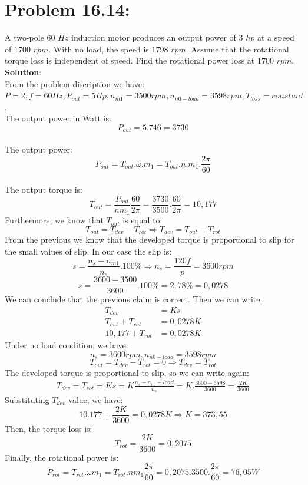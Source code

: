 \documentclass[9pt]{extarticle}
\begin{document}
\section*{Problem 16.14:} A two-pole $60$ $Hz$ induction motor produces an output power
of $3$ $hp$ at a speed of $1700$ $rpm$. With no load, the speed is $1798$ $rpm$. Assume that the
rotational torque loss is independent of speed. Find the rotational power loss at $1700$ $rpm$.
\\ \textbf{Solution}:\\ From the problem discription we have:
$P=2, f=60Hz, P_{out}=5Hp, n_{m1}=3500rpm, n_{n0-load}=3598 rpm, T_{loss}= constant$.
\\The output power in Watt is:
$$P_{out}=5.746=3730$$
\\The output power:
$$P_{out}=T_{out}.\omega.m_{1}=T_{out}.n.m_{1}.\frac{2\pi}{60}$$
\\The output torque is:
$$T_{out}=\frac{P_{out}}{nm_{1}}\frac{60}{2\pi}=\frac{3730}{3500}.\frac{60}{2\pi}=10,177$$
Furthermore, we know that $T_{out}$ is equal to:
$$T_{out}=T_{dev}-T_{rot}\Rightarrow T_{dev}=T_{out}+T_{rot}$$
From the previous we know that the developed torque is proportional to slip for
the small values of slip. In our case the slip is:
\begin{equation*}
s=\frac{n_{s}-n_{m1}}{n_{s}}.100\% \Rightarrow n_{s}=\frac{120f}{p}=3600 rpm
\end{equation*}
\begin{equation*}
s=\frac{3600-3500}{3600}.100\%=2,78\%=0,0278
\end{equation*}
We can conclude that the previous claim is correct. Then we can write:
\begin{align*}
T_{dev}&=Ks\\
T_{out}+T_{rot}&=0,0278K\\
10,177+T_{rot}&=0,0278K
\end{align*}
Under no load condition, we have:
$$n_{s}=3600 rpm, n_{n0-load}=3598 rpm$$
$$T_{out}=T_{dev}-T_{rot}=0\Rightarrow T_{dev}=T_{rot}$$
The developed torque is proportional to slip, so we can write again:
\begin{align*}
T_{dev}=T_{rot}=Ks=K\frac{n_{s}-n_{n0}-load}{n_{s}}=K.\frac{3600-3598}{3600}=\frac{2K}{3600}
\end{align*}
Substituting $T_{dev}$ value, we have:
$$10.177+\frac{2K}{3600}=0,0278K\Rightarrow K=373,55$$
Then, the torque loss is:
$$T_{rot}=\frac{2K}{3600}=0,2075$$
Finally, the rotational power is:
$$P_{rot}=T_{rot}.\omega m_{1}=T_{rot}.nm_{1}\frac{2\pi}{60}=0,2075.3500.\frac{2\pi}{60}=76,05W$$
\end{document}
